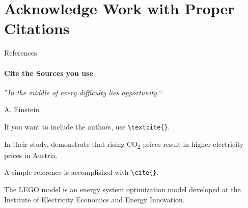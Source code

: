 \documentclass[aspectratio=169]{beamer}
\begin{document}
\section{\textbf{Acknowledge} Work with Proper \textbf{Citations}}

\begin{frame}
\end{frame}


\begin{frame}{References}
    \framesubtitle{Cite the Sources you use}

    \vspace{-.8cm}
    \begin{coloredblock}[grey]
        \centering
        ”\textit{In the middle of every difficulty lies opportunity.}“
          
        \vspace{0.7cm}
        \scriptsize A. Einstein \cite{einstein2018}
    \end{coloredblock}
    
    \begin{coloredblock}
        If you want to include the authors, use \texttt{\textbackslash textcite\{\}}.
    
        \vspace{0.5cm}
        In their study, \textbf{\textcite{gaugl2023}} demonstrate that rising CO\textsubscript{2} prices result in higher electricity prices in Austria.
    \end{coloredblock}
    
    \begin{coloredblock}
        A simple reference is accomplished with \texttt{\textbackslash cite\{\}}.
    
        \vspace{0.5cm}
        The LEGO model is an energy system optimization model developed at the Institute of Electricity Economics and Energy Innovation. \textbf{\cite{wogrin2022}}
    \end{coloredblock}

\end{frame}


\end{document}
